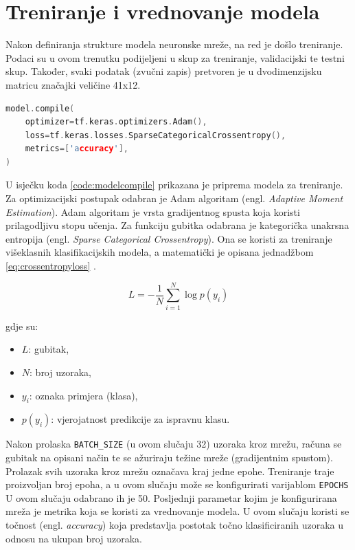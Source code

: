 \section{Treniranje i vrednovanje modela}
\label{sec:training}

Nakon definiranja strukture modela neuronske mreže, na red je došlo treniranje. Podaci 
su u ovom trenutku podijeljeni u skup za treniranje, validacijski te testni skup. Također,
svaki podatak (zvučni zapis) pretvoren je u dvodimenzijsku matricu značajki veličine 41x12.


\begin{lstlisting}[language=C++, caption=Konfiguracija za treniranje, label=code:modelcompile]
model.compile(
    optimizer=tf.keras.optimizers.Adam(),
    loss=tf.keras.losses.SparseCategoricalCrossentropy(),
    metrics=['accuracy'],
)
\end{lstlisting}

U isječku koda \ref{code:modelcompile} prikazana je priprema modela za treniranje.
Za optimizacijski postupak odabran je Adam algoritam (engl. \textit{Adaptive Moment Estimation}).
Adam algoritam je vrsta gradijentnog spusta koja koristi prilagodljivu stopu učenja.
Za funkciju gubitka odabrana je kategorička unakrsna entropija (engl. \textit{Sparse Categorical
Crossentropy}). Ona se koristi za treniranje višeklasnih klasifikacijskih modela, a
matematički je opisana jednadžbom \eqref{eq:crossentropyloss} .

\begin{equation}
    \label{eq:crossentropyloss}
    L = - \frac{1}{N} \sum_{i=1}^{N} \log p(y_i)
\end{equation}

gdje su:
\begin{itemize}
    \item \( L \): gubitak,
    \item \( N \): broj uzoraka,
    \item \( y_i \): oznaka primjera (klasa),
    \item \( p(y_i) \): vjerojatnost predikcije za ispravnu klasu.
\end{itemize}

Nakon prolaska \texttt{BATCH\_SIZE} (u ovom slučaju 32) uzoraka kroz mrežu, računa se
gubitak na opisani način te se ažuriraju težine mreže (gradijentnim spustom).
Prolazak svih uzoraka kroz mrežu označava kraj jedne epohe. Treniranje traje 
proizvoljan broj epoha, a u ovom slučaju može se konfigurirati varijablom \texttt{EPOCHS}
U ovom slučaju odabrano ih je 50.
Posljednji parametar kojim je konfigurirana mreža je metrika koja se koristi za
vrednovanje modela. U ovom slučaju koristi se točnost (engl. \textit{accuracy}) koja
predstavlja postotak točno klasificiranih uzoraka u odnosu na ukupan broj uzoraka.

